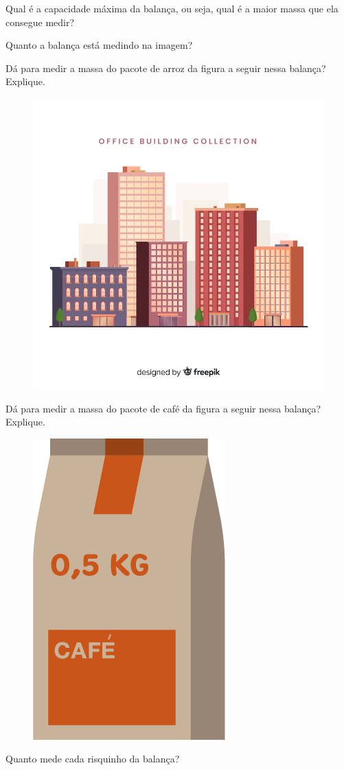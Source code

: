 \begin{escolha}
\item  Qual é a capacidade máxima da balança, ou seja, qual é a maior massa que ela consegue medir?


\item  Quanto a balança está medindo na imagem?


\pagebreak

\item  Dá para medir a massa do pacote de arroz da figura a seguir nessa balança? Explique.


\begin{figure}[htpb!]
\centering
\includegraphics[width=.3\textwidth]{./media/image43.png}
\end{figure}


\item  Dá para medir a massa do pacote de café da figura a seguir nessa balança? Explique.


\begin{figure}[htpb!]
\centering
\includegraphics[width=.2\textwidth]{./media/image44.png}
\end{figure}


\item  Quanto mede cada risquinho da balança?

\end{escolha}

